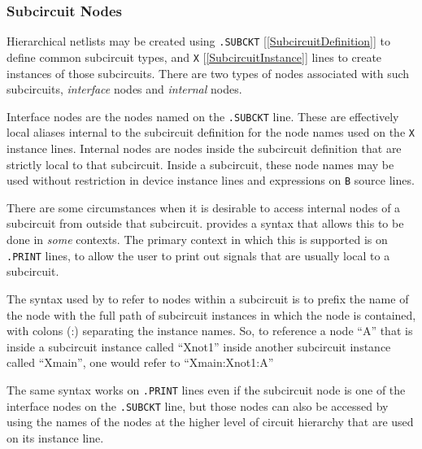 \subsubsection{Subcircuit Nodes}

Hierarchical netlists may be created using
\texttt{.SUBCKT} [\ref{SubcircuitDefinition}] to define common subcircuit
types, and \texttt{X} [\ref{SubcircuitInstance}] lines to create
instances of those subcircuits.  There are two types of nodes
associated with such subcircuits, {\em interface\/} nodes and {\em
internal\/} nodes.

Interface nodes are the nodes named on the \texttt{.SUBCKT} line.
These are effectively local aliases internal to the subcircuit
definition for the node names used on the \texttt{X} instance lines.
Internal nodes are nodes inside the subcircuit definition that are
strictly local to that subcircuit.  Inside a subcircuit, these node
names may be used without restriction in device instance lines and
expressions on \texttt{B} source lines.

There are some circumstances when it is desirable to access internal
nodes of a subcircuit from outside that subcircuit.  \Xyce{} provides a
syntax that allows this to be done in {\em some\/} contexts.  The
primary context in which this is supported is on \texttt{.PRINT}
lines, to allow the user to print out signals that are usually local
to a subcircuit.

The syntax used by \Xyce{} to refer to nodes within a subcircuit is to
prefix the name of the node with the full path of subcircuit instances
in which the node is contained, with colons (:) separating the
instance names.  So, to reference a node ``A'' that is inside a
subcircuit instance called ``Xnot1'' inside another subcircuit
instance called ``Xmain'', one would refer to ``Xmain:Xnot1:A''

The same syntax works on \texttt{.PRINT} lines even if the subcircuit
node is one of the interface nodes on the \texttt{.SUBCKT} line, but
those nodes can also be accessed by using the names of the nodes at
the higher level of circuit hierarchy that are used on its instance
line.

\begin{centering}
\end{centering}


